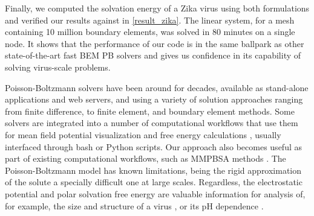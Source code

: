 Finally, we computed the solvation energy of a Zika virus using both formulations and verified our results against \pygbe in \ref{result_zika}.
The linear system, for a mesh containing 10 million boundary elements, was solved in 80 minutes on a single node.
It shows that the performance of our code is in the same ballpark as other state-of-the-art fast BEM PB solvers \cite{GengKrasny2013,ZhangPengHuangPitsianisSunLu2015,CooperBardhanBarba2014} and gives us confidence in its capability of solving virus-scale problems.

Poisson-Boltzmann solvers have been around for decades, available as stand-alone applications and web servers, and using a variety of solution approaches \cite{JurrusETal2018} ranging from finite difference, to finite element, and boundary element methods.
Some solvers are integrated into a number of computational workflows that use them for mean field potential visualization \cite{HumphreyETal1996} and free energy calculations \cite{MillerETal2012,KumariETal2014}, usually interfaced through bash or Python scripts.
Our approach also becomes useful as part of existing computational workflows, such as MMPBSA methods \cite{WangETal2018}.
The Poisson-Boltzmann model has known limitations, being the rigid approximation of the solute a specially difficult one at large scales. 
Regardless, the electrostatic potential and polar solvation free energy are valuable information for analysis of, for example, the size and structure of a virus \cite{SiberETal2012}, or its pH dependence \cite{RoshalETal2019}. 

